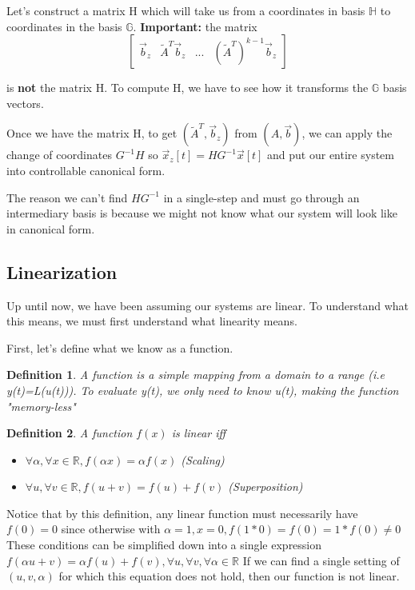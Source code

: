 \documentclass{article}
\newtheorem{definition}{Definition}
\begin{document}
Let's construct a matrix H which will take us from a coordinates in basis $\mathbb{H}$ to coordinates in the basis $\mathbb{G}$. 
\textbf{Important:} the matrix \[
    \left[
        \begin{array}{c|c|c|c}
            \vec{b}_z & \tilde{A}^T\vec{b}_z & ... &(\tilde{A}^T)^{k-1}\vec{b}_z
        \end{array}
        \right]
    \]

is \textbf{not} the matrix H. To compute H, we have to see how it transforms the $\mathbb{G}$ basis vectors.

Once we have the matrix H, to get $(\tilde{A}^T, \vec{b}_z)$ from $(A, \vec{b})$,
we can apply the change of coordinates $G^{-1}H$ so $\vec{x}_z[t]=HG^{-1}\vec{x}[t]$ and put our entire system into controllable canonical form.

The reason we can't find $HG^{-1}$ in a single-step and must go through an intermediary basis is because we might not know what our system will look like in canonical form.

\subsection{Linearization}
Up until now, we have been assuming our systems are linear. To understand what this means, we must first understand what linearity means.

First, let's define what we know as a function.
\begin{definition}
    A function is a simple mapping from a domain to a range (i.e y(t)=L(u(t))). 
    To evaluate y(t), we only need to know u(t), making the function "memory-less"
\end{definition}
\begin{definition}
    A function $f(x)$ is linear iff
    \begin{itemize}
        \item $\forall \alpha, \forall x \in \mathbb{R}, f(\alpha x) = \alpha f(x)$ (Scaling)
        \item $\forall u, \forall v \in \mathbb{R}, f(u + v) = f(u)+f(v)$ (Superposition)
    \end{itemize}
\end{definition}
Notice that by this definition, any linear function must necessarily have $f(0)=0$ since otherwise with $\alpha = 1, x=0, f(1*0)=f(0)=1*f(0)\ne 0$
These conditions can be simplified down into a single expression $f(\alpha u + v) = \alpha f(u) + f(v), \forall u, \forall v, \forall \alpha \in \mathbb{R}$
If we can find a single setting of $(u, v, \alpha)$ for which this equation does not hold, then our function is not linear.
\end{document}
